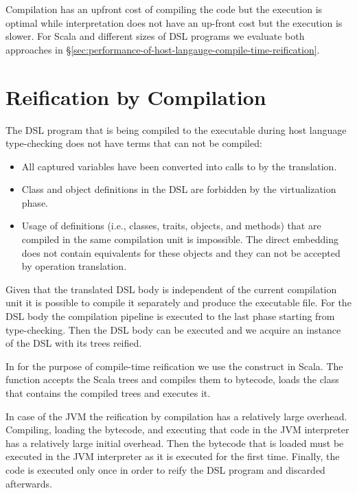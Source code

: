 Compilation has an upfront cost of compiling the code but the execution is optimal while
 interpretation does not have an up-front cost but the execution is slower. For Scala
 and different sizes of DSL programs we evaluate both approaches in \S \ref{sec:performance-of-host-langauge-compile-time-reification}.

\section{Reification by Compilation}
\label{sec:reification-by-compilation}

The DSL program that is being compiled to the executable during host language type-checking
 does not have terms that can not be compiled:\begin{itemize}
  \item All captured variables have been converted into calls to  by the translation.
  \item Class and object definitions in the DSL are forbidden by the virtualization phase.
  \item Usage of definitions (i.e., classes, traits, objects, and methods) that are compiled in the same compilation
   unit is impossible. The direct embedding does not contain equivalents for these objects and they can
   not be accepted by operation translation.
\end{itemize}

Given that the translated DSL body is independent of the current compilation unit it is possible to
 compile it separately and produce the executable file. For the DSL body the compilation
 pipeline is executed to the last phase starting from type-checking. Then the DSL body
 can be executed and we acquire an instance of the DSL with its trees reified.

In \yy for the purpose of compile-time reification we use the  construct in Scala. The  function
 accepts the Scala trees and compiles them to bytecode, loads the class that contains the compiled trees and
executes it.

In case of the JVM the reification by compilation has a relatively large overhead. Compiling, loading the bytecode, and executing that code in the JVM interpreter has a relatively large initial overhead. Then the bytecode that is loaded must be executed in the JVM interpreter as it is executed for the first time. Finally, the code is executed only once in order to reify the DSL program and discarded afterwards.

